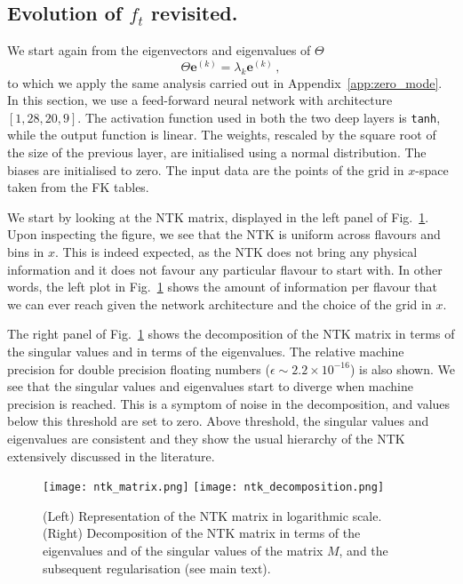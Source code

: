 \documentclass[11pt]{article}
\begin{document}
\subsection{Evolution of $f_t$ revisited.}
We start again from the eigenvectors and eigenvalues of $\Theta$
\begin{equation}
  \Theta \pmb{e}^{(k)} = \lambda_k \pmb{e}^{(k)}\,,
\end{equation}
to which we apply the same analysis carried out in Appendix~\ref{app:zero_mode}.
In this section, we use a feed-forward neural network with architecture
$[1,28,20,9]$. The activation function used in both the two deep layers is
\texttt{tanh}, while the output function is linear. The weights, rescaled by the
square root of the size of the previous layer, are initialised using a normal
distribution. The biases are initialised to zero. The input data are the points
of the grid in $x$-space taken from the FK tables.

We start by looking at the NTK matrix, displayed in the left panel of
Fig.~\ref{fig:NTKDecomposition}. Upon inspecting the figure, we see that the NTK
is uniform across flavours and bins in $x$. This is indeed expected, as the NTK
does not bring any physical information and it does not favour any particular
flavour to start with. In other words, the left plot in Fig.~\ref{fig:NTKDecomposition} 
shows the amount of information per flavour that we can ever reach given 
the network architecture and the choice of the grid in $x$.

The right panel of Fig.~\ref{fig:NTKDecomposition} shows the decomposition of
the NTK matrix in terms of the singular values and in terms of the eigenvalues.
The relative machine precision for double precision floating numbers ($\epsilon
\sim 2.2 \times 10^{-16}$) is also shown. We see that the singular values and
eigenvalues start to diverge when machine precision is reached. This is a
symptom of noise in the decomposition, and values below this threshold are set
to zero. Above threshold, the singular values and eigenvalues are consistent
and they show the usual hierarchy of the NTK extensively discussed in the
literature.
\begin{figure}[!t]
  \centering
  \texttt{[image: ntk\_matrix.png]}
  \hspace{0.05\textwidth}
  \texttt{[image: ntk\_decomposition.png]}
  \caption{\small (Left) Representation of the NTK matrix in logarithmic scale. 
          (Right) Decomposition of the NTK matrix in terms of the eigenvalues and of the
          singular values of the matrix $M$, and the subsequent regularisation (see main text).}
  \label{fig:NTKDecomposition}
\end{figure}
\end{document}
